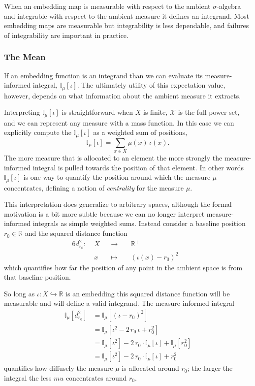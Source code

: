 \documentclass[
  letterpaper,
  DIV=11,
  numbers=noendperiod]{scrartcl}
\begin{document}
When an embedding map is measurable with respect to the ambient
\(\sigma\)-algebra and integrable with respect to the ambient measure it
defines an integrand. Most embedding maps are measurable but
integrability is less dependable, and failures of integrability are
important in practice.

\hypertarget{the-mean}{%
\subsubsection{The Mean}\label{the-mean}}

If an embedding function is an integrand than we can evaluate its
measure-informed integral, \(\mathbb{I}_{\mu}[\iota]\). The ultimately
utility of this expectation value, however, depends on what information
about the ambient measure it extracts.

Interpreting \(\mathbb{I}_{\mu}[\iota]\) is straightforward when \(X\)
is finite, \(\mathcal{X}\) is the full power set, and we can represent
any measure with a mass function. In this case we can explicitly compute
the \(\mathbb{I}_{\mu}[\iota]\) as a weighted sum of positions, \[
\mathbb{I}_{\mu}[\iota] = \sum_{x \in X} \mu(x) \, \iota(x).
\] The more measure that is allocated to an element the more strongly
the measure-informed integral is pulled towards the position of that
element. In other words \(\mathbb{I}_{\mu}[\iota]\) is one way to
quantify the position around which the measure \(\mu\) concentrates,
defining a notion of \emph{centrality} for the measure \(\mu\).

This interpretation does generalize to arbitrary spaces, although the
formal motivation is a bit more subtle because we can no longer
interpret measure-informed integrals as simple weighted sums. Instead
consider a baseline position \(r_{0} \in \mathbb{R}\) and the squared
distance function \begin{alignat*}{6}
d_{r_{0}}^{2} :\; & X & &\rightarrow& \; &\mathbb{R}^{+}&
\\
& x & &\mapsto& & (\iota(x) - r_{0})^{2} &
\end{alignat*} which quantifies how far the position of any point in the
ambient space is from that baseline position.

So long as \(\iota : X \hookrightarrow \mathbb{R}\) is an embedding this
squared distance function will be measurable and will define a valid
integrand. The measure-informed integral \begin{align*}
\mathbb{I}_{\mu} \left[ d_{r_{0}}^{2} \right]
&=
\mathbb{I}_{\mu} \left[ (\iota - r_{0})^{2} \right]
\\
&=
\mathbb{I}_{\mu} \left[ \iota^{2} - 2 \, r_{0} \, \iota + r_{0}^{2} \right]
\\
&=
\mathbb{I}_{\mu} \left[ \iota^{2} \right]
-2 \, r_{0} \cdot \mathbb{I}_{\mu} \left[ \iota \right]
+ \mathbb{I}_{\mu} \left[ r_{0}^{2} \right]
\\
&=
\mathbb{I}_{\mu} \left[ \iota^{2} \right]
-2 \, r_{0} \cdot \mathbb{I}_{\mu} \left[ \iota \right]
+ r_{0}^{2}
\end{align*} quantifies how diffusely the measure \(\mu\) is allocated
around \(r_{0}\); the larger the integral the less \(mu\) concentrates
around \(r_{0}\).
\end{document}
